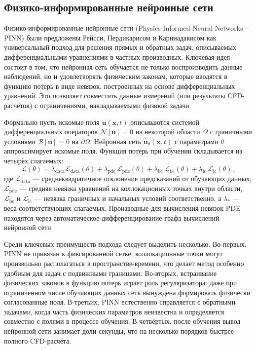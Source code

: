 \documentclass[12pt,a4paper]{article}
\begin{document}
\subsection{Физико-информированные нейронные сети}

Физико-информированные нейронные сети (Physics-Informed Neural Networks -- PINN)
были предложены Рейсси, Пердикарисом и Карниадакисом \cite{Raissi2019} как
универсальный подход для решения прямых и обратных задач, описываемых
дифференциальными уравнениями в частных производных. Ключевая идея состоит в
том, что нейронная сеть обучается не только воспроизводить данные наблюдений,
но и удовлетворять физическим законам, которые вводятся в функцию потерь в виде
невязок, построенных на основе дифференциальных уравнений. Это позволяет совместить данные измерений
(или результаты CFD-расчётов) с ограничениями, накладываемыми физикой задачи.

Формально пусть искомые поля $\mathbf{u}(\mathbf{x}, t)$ описываются системой
дифференциальных операторов $\mathcal{N}[\mathbf{u}]=0$ на некоторой области
$\Omega$ с граничными условиями $\mathcal{B}[\mathbf{u}]=0$ на $\partial\Omega$.
Нейронная сеть $\hat{\mathbf{u}}_\theta(\mathbf{x}, t)$ с параметрами $\theta$
аппроксимирует искомые поля. Функция потерь при обучении складывается из четырёх
слагаемых:
\begin{equation}
\mathcal{L}(\theta) =  \lambda_{\mathrm{data}}\mathcal{L}_{\mathrm{data}}(\theta)
  + \lambda_{\mathrm{pde}}\,\mathcal{L}_{\mathrm{pde}}(\theta)
  + \lambda_{\mathrm{bc}}\,\mathcal{L}_{\mathrm{bc}}(\theta)
  + \lambda_{\mathrm{ic}}\,\mathcal{L}_{\mathrm{ic}}(\theta),
\end{equation}
где $\mathcal{L}_{\mathrm{data}}$ --- среднеквадратичное отклонение предсказаний
от обучающих данных, $\mathcal{L}_{\mathrm{pde}}$ --- средняя невязка уравнений
на коллокационных точках внутри области, $\mathcal{L}_{\mathrm{bc}}$ и $\mathcal{L}_{\mathrm{ic}}$ ---
невязка граничных и начальных условий соответственно, а $\lambda_{*}$
--- веса соответствующих слагаемых. Производные для вычисления невязок PDE
находятся через автоматическое дифференцирование графа вычислений нейронной сети.

Среди ключевых преимуществ подхода следует выделить несколько. Во-первых,
PINN не привязан к фиксированной сетке: коллокационные точки могут произвольно
располагаться в пространстве-времени, что делает метод особенно удобным для
задач с подвижными границами. Во-вторых, встраивание физических законов в
функцию потерь играет роль регуляризатора: даже при ограниченном числе
обучающих данных сеть вынуждена формировать физически согласованные поля.
В-третьих, PINN естественно справляется с обратными задачами, когда часть
физических параметров неизвестна и определяется совместно с полями в процессе
обучения. В-четвёртых, после обучения вывод нейронной сети занимает доли
секунды, что на несколько порядков быстрее полного CFD-расчёта.
\end{document}
